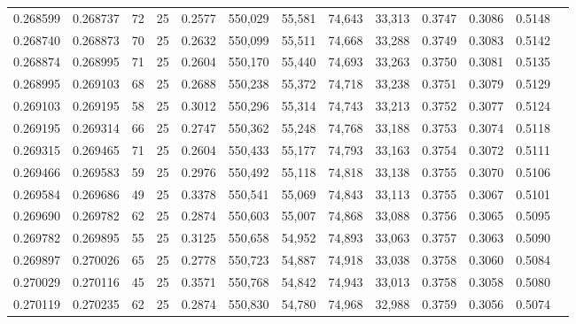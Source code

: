 \begin{tabular}{rrrrrrrrrrrrr}
0.268599 & 0.268737 &    72 &  25 &                                     0.2577 & 550,029 &  55,581 &  74,643 &  33,313 & 0.3747 & 0.3086 & 0.5148 \\
0.268740 & 0.268873 &    70 &  25 &                                     0.2632 & 550,099 &  55,511 &  74,668 &  33,288 & 0.3749 & 0.3083 & 0.5142 \\
0.268874 & 0.268995 &    71 &  25 &                                     0.2604 & 550,170 &  55,440 &  74,693 &  33,263 & 0.3750 & 0.3081 & 0.5135 \\
0.268995 & 0.269103 &    68 &  25 &                                     0.2688 & 550,238 &  55,372 &  74,718 &  33,238 & 0.3751 & 0.3079 & 0.5129 \\
0.269103 & 0.269195 &    58 &  25 &                                     0.3012 & 550,296 &  55,314 &  74,743 &  33,213 & 0.3752 & 0.3077 & 0.5124 \\
0.269195 & 0.269314 &    66 &  25 &                                     0.2747 & 550,362 &  55,248 &  74,768 &  33,188 & 0.3753 & 0.3074 & 0.5118 \\
0.269315 & 0.269465 &    71 &  25 &                                     0.2604 & 550,433 &  55,177 &  74,793 &  33,163 & 0.3754 & 0.3072 & 0.5111 \\
0.269466 & 0.269583 &    59 &  25 &                                     0.2976 & 550,492 &  55,118 &  74,818 &  33,138 & 0.3755 & 0.3070 & 0.5106 \\
0.269584 & 0.269686 &    49 &  25 &                                     0.3378 & 550,541 &  55,069 &  74,843 &  33,113 & 0.3755 & 0.3067 & 0.5101 \\
0.269690 & 0.269782 &    62 &  25 &                                     0.2874 & 550,603 &  55,007 &  74,868 &  33,088 & 0.3756 & 0.3065 & 0.5095 \\
0.269782 & 0.269895 &    55 &  25 &                                     0.3125 & 550,658 &  54,952 &  74,893 &  33,063 & 0.3757 & 0.3063 & 0.5090 \\
0.269897 & 0.270026 &    65 &  25 &                                     0.2778 & 550,723 &  54,887 &  74,918 &  33,038 & 0.3758 & 0.3060 & 0.5084 \\
0.270029 & 0.270116 &    45 &  25 &                                     0.3571 & 550,768 &  54,842 &  74,943 &  33,013 & 0.3758 & 0.3058 & 0.5080 \\
0.270119 & 0.270235 &    62 &  25 &                                     0.2874 & 550,830 &  54,780 &  74,968 &  32,988 & 0.3759 & 0.3056 & 0.5074 \\

\end{tabular}
